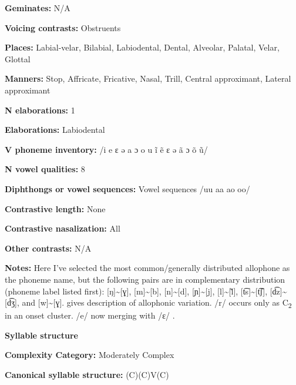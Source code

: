 \textbf{Geminates:} N/A



\textbf{Voicing contrasts:} Obstruents



\textbf{Places:} Labial-velar, Bilabial, Labiodental, Dental, Alveolar, Palatal, Velar, Glottal



\textbf{Manners:} Stop, Affricate, Fricative, Nasal, Trill, Central approximant, Lateral approximant



\textbf{N elaborations:} 1



\textbf{Elaborations:} Labiodental



\textbf{V phoneme inventory:} /i e ɛ ə a ɔ o u ĩ ẽ ɛ ə ã ɔ õ ũ/



\textbf{N vowel qualities:} 8



\textbf{Diphthongs or vowel sequences:} Vowel sequences /uu aa ao oo/



\textbf{Contrastive length:} None



\textbf{Contrastive nasalization:} All



\textbf{Other contrasts:} N/A



\textbf{Notes:} Here I’ve selected the most common/generally distributed allophone as the phoneme name, but the following pairs are in complementary distribution (phoneme label listed first): [ŋ]{\textasciitilde}[ɣ], [m]{\textasciitilde}[b], [n]{\textasciitilde}[d], [ɲ]{\textasciitilde}[j], [l]{\textasciitilde}[\~{l}], [t͡s]{\textasciitilde}[t͡ʃ], [d͡z]{\textasciitilde}[d͡ʒ], and [w]{\textasciitilde}[ɣ]. \citet[10-18]{Duthie1996} gives description of allophonic variation. /r/ occurs only as C\textsubscript{2} in an onset cluster. /e/ now merging with /ɛ/ \citep[19]{Duthie1996}.



\textbf{Syllable structure}



\textbf{Complexity Category:} Moderately Complex



\textbf{Canonical syllable structure:} (C)(C)V(C) \citep[38-9]{Ameka1991}



